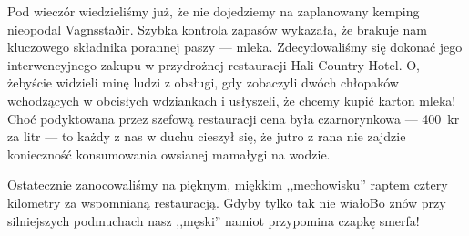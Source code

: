 

Pod wieczór wiedzieliśmy już, że nie dojedziemy na zaplanowany kemping nieopodal Vagnsstaðir. Szybka kontrola zapasów wykazała, że brakuje nam kluczowego składnika porannej paszy --- mleka. Zdecydowaliśmy się dokonać jego interwencyjnego zakupu w przydrożnej restauracji Hali Country Hotel. O, żebyście widzieli minę ludzi z obsługi, gdy zobaczyli dwóch chłopaków wchodzących w obcisłych wdziankach i usłyszeli, że chcemy kupić karton mleka! Choć podyktowana przez szefową restauracji cena była czarnorynkowa --- 400~kr za litr --- to każdy z nas w duchu cieszył się, że jutro z rana nie zajdzie konieczność konsumowania owsianej mamałygi na wodzie.

Ostatecznie zanocowaliśmy na pięknym, miękkim ,,mechowisku'' raptem cztery kilometry za wspomnianą restauracją. Gdyby tylko tak nie wiało\textellipsis Bo znów przy silniejszych podmuchach nasz ,,męski'' namiot przypomina czapkę smerfa!